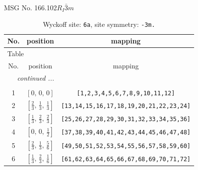 \documentclass[fleqn,8pt]{jsarticle}
\begin{document}
\setcounter{MaxMatrixCols}{32}

\renewcommand{\tablename}{Table~}
\renewcommand{\figurename}{Figure~}
\begin{center}
\LARGE
MSG No. 166.102\quad$R_{I}\bar{3}m$
\end{center}
\renewcommand{\arraystretch}{1.2}
\begin{longtable}{ccc}
\caption{Wyckoff site: {\tt 6a}, site symmetry: {\tt -3m.}}
 \\
 \hline \hline
No. & position & mapping \\ \hline \endfirsthead

\multicolumn{2}{l}{\tablename\ \thetable{}} \\
 \hline \hline
No. & position & mapping \\ \hline \endhead

 \hline \hline
\multicolumn{2}{r}{\footnotesize\it continued ...} \\ \endfoot

 \hline \hline
\multicolumn{2}{r}{} \\ \endlastfoot

1 & $\left[ 0,\, 0,\, 0 \right]$ & {\tt [1,2,3,4,5,6,7,8,9,10,11,12]} \\ \hline
2 & $\left[ \frac{2}{3},\, \frac{1}{3},\, \frac{1}{3} \right]$ & {\tt [13,14,15,16,17,18,19,20,21,22,23,24]} \\ \hline
3 & $\left[ \frac{1}{3},\, \frac{2}{3},\, \frac{2}{3} \right]$ & {\tt [25,26,27,28,29,30,31,32,33,34,35,36]} \\ \hline
4 & $\left[ 0,\, 0,\, \frac{1}{2} \right]$ & {\tt [37,38,39,40,41,42,43,44,45,46,47,48]} \\ \hline
5 & $\left[ \frac{2}{3},\, \frac{1}{3},\, \frac{5}{6} \right]$ & {\tt [49,50,51,52,53,54,55,56,57,58,59,60]} \\ \hline
6 & $\left[ \frac{1}{3},\, \frac{2}{3},\, \frac{1}{6} \right]$ & {\tt [61,62,63,64,65,66,67,68,69,70,71,72]} \\
\end{longtable}
\renewcommand{\arraystretch}{1.2}
\end{document}

